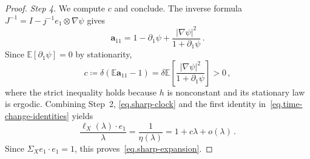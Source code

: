 \documentclass[11pt]{amsart}
\theoremstyle{definition}
\theoremstyle{remark}
\numberwithin{equation}{section}
\newcommand{\E}{\mathbb E}
\renewcommand{\a}{\mathbf a}
\begin{document}
\begin{proof}
\emph{Step 4.} We compute $c$ and conclude. The inverse formula $J^{-1}=I-j^{-1}e_1\otimes\nabla\psi$ gives
\begin{equation*}
 \a_{11}=1-\partial_1\psi+\frac{|\nabla\psi|^2}{1+\partial_1\psi}\, .
\end{equation*}
Since $\E[\partial_1\psi]=0$ by stationarity,
\begin{equation}\label{eq.sharp-constant}
 c\coloneqq\delta(\E\a_{11}-1)
 =\delta\E\left[\frac{|\nabla\psi|^2}{1+\partial_1\psi}\right]>0\, ,
\end{equation}
where the strict inequality holds because $h$ is nonconstant and its stationary law is ergodic. Combining Step~2, \eqref{eq.sharp-clock} and the first identity in~\eqref{eq.time-change-identities} yields
\begin{equation*}
 \frac{\ell_X(\lambda)\cdot e_1}{\lambda}
 =\frac1{\eta(\lambda)}
 =1+c\lambda+o(\lambda)\, .
\end{equation*}
Since $\Sigma_Xe_1\cdot e_1=1$, this proves~\eqref{eq.sharp-expansion}.
\end{proof}



\end{document}
